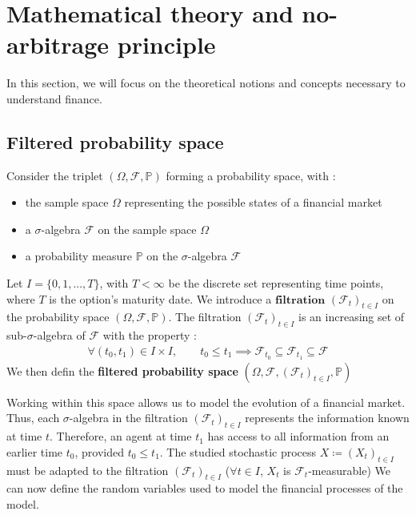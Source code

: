\section{Mathematical theory and no-arbitrage principle}

In this section, we will focus on the theoretical notions and concepts necessary to understand finance.

\subsection{Filtered probability space}

Consider the triplet $(\Omega,\mathcal{F},\mathbb{P})$ forming a probability space, with : 
\begin{itemize}
    \item[$\bullet$] the sample space $\Omega$ representing the possible states of a financial market
    \item[$\bullet$] a $\sigma$-algebra $\mathcal{F}$ on the sample space $\Omega$
    \item[$\bullet$] a probability measure $\mathbb{P}$ on the $\sigma$-algebra $\mathcal{F}$
\end{itemize}

Let $I = \{0,1,...,T\}$, with $T < \infty$ be the discrete set representing time points, where $T$ is the option's maturity date.
We introduce a $\textbf{filtration}$ $(\mathcal{F}_t)_{t \in I}$ on the probability space $(\Omega,\mathcal{F},\mathbb{P})$. 
The filtration $(\mathcal{F}_t)_{t \in I}$ is an increasing set of sub-$\sigma$-algebra of $\mathcal{F}$ with the property : 
\begin{align*}
    \forall (t_0,t_1) \in I \times I, \qquad t_0 \le t_1 \implies \mathcal{F}_{t_0} \subseteq \mathcal{F}_{t_1} \subseteq \mathcal{F}
\end{align*}
\cite{Filtration}
We then defin the \textbf{filtered probability space} $(\Omega, \mathcal{F}, (\mathcal{F}_t)_{t \in I}, \mathbb{P})$

\bigskip

\remark Working within this space allows us to model the evolution of a financial market.
Thus, each $\sigma$-algebra in the filtration $(\mathcal{F}_t)_{t \in I}$ represents the information known at time $t$.
Therefore, an agent at time $t_1$ has access to all information from an earlier time $t_0$, provided $t_0 \leq t_1$.
The studied stochastic process $X\coloneq(X_t)_{t \in I}$ must be adapted to the filtration $(\mathcal{F}_t)_{t \in I}$ ($\forall t \in I$, $X_t$ is $\mathcal{F}_t$-measurable) 
We can now define the random variables used to model the financial processes of the model.

